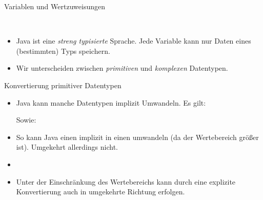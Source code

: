 \begin{frame}{Variablen und Wertzuweisungen}
    \pause{}
    \begin{center}
        \parbox{7cm}{\!\\
        }
    \end{center}
    \begin{itemize}[<+(1)->]
        \widei
        \item Java ist eine \emph{streng typisierte} Sprache.\pause{} Jede Variable kann nur Daten eines (bestimmten) Typs speichern.
        \item Wir unterscheiden zwischen \emph{primitiven} und \emph{komplexen} Datentypen. 
    \end{itemize}
\end{frame}

\begin{frame}{Konvertierung primitiver Datentypen}
    \begin{itemize}[<+(1)->]
        \widei
        \item Java kann manche Datentypen implizit Umwandeln.\pause{} Es gilt:\pause{}
        \begin{center}
             \mprec{}  \mprec{}  \mprec{}  \mprec{}  \mprec{} 
        \end{center}
        \pause{}Sowie:\pause{}
        \begin{center}
             \mprec{} 
        \end{center}
        \item So kann Java einen  implizit in einen  umwandeln\pause{} (da der Wertebereich größer ist).\pause{} Umgekehrt allerdings nicht.
        \item {}
        \item Unter der Einschränkung des Wertebereichs kann durch  eine explizite Konvertierung auch in umgekehrte Richtung erfolgen.
    \end{itemize}
\end{frame}



